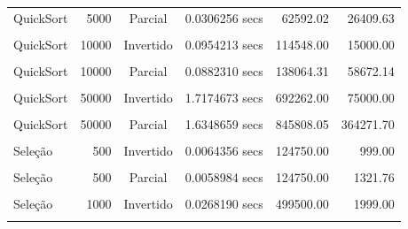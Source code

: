 \documentclass[
]{article}
\begin{document}
\begin{longtable}[l]{lrccrr}
QuickSort & 5000 & Parcial & 0.0306256 secs & 62592.02 & 26409.63\\
\cellcolor{gray!15}{QuickSort} & \cellcolor{gray!15}{10000} & \cellcolor{gray!15}{Aleatório} & \cellcolor{gray!15}{0.0971727 secs} & \cellcolor{gray!15}{143824.18} & \cellcolor{gray!15}{92592.51}\\
QuickSort & 10000 & Invertido & 0.0954213 secs & 114548.00 & 15000.00\\
\cellcolor{gray!15}{QuickSort} & \cellcolor{gray!15}{10000} & \cellcolor{gray!15}{Ordenado} & \cellcolor{gray!15}{0.0973439 secs} & \cellcolor{gray!15}{119535.00} & \cellcolor{gray!15}{0.00}\\
QuickSort & 10000 & Parcial & 0.0882310 secs & 138064.31 & 58672.14\\
\cellcolor{gray!15}{QuickSort} & \cellcolor{gray!15}{50000} & \cellcolor{gray!15}{Aleatório} & \cellcolor{gray!15}{1.7015193 secs} & \cellcolor{gray!15}{848051.17} & \cellcolor{gray!15}{543859.65}\\
QuickSort & 50000 & Invertido & 1.7174673 secs & 692262.00 & 75000.00\\
\cellcolor{gray!15}{QuickSort} & \cellcolor{gray!15}{50000} & \cellcolor{gray!15}{Ordenado} & \cellcolor{gray!15}{1.7960176 secs} & \cellcolor{gray!15}{717248.00} & \cellcolor{gray!15}{0.00}\\
QuickSort & 50000 & Parcial & 1.6348659 secs & 845808.05 & 364271.70\\
\cellcolor{gray!15}{Seleção} & \cellcolor{gray!15}{500} & \cellcolor{gray!15}{Aleatório} & \cellcolor{gray!15}{0.0060219 secs} & \cellcolor{gray!15}{124750.00} & \cellcolor{gray!15}{1485.98}\\
Seleção & 500 & Invertido & 0.0064356 secs & 124750.00 & 999.00\\
\cellcolor{gray!15}{Seleção} & \cellcolor{gray!15}{500} & \cellcolor{gray!15}{Ordenado} & \cellcolor{gray!15}{0.0070200 secs} & \cellcolor{gray!15}{124750.00} & \cellcolor{gray!15}{499.00}\\
Seleção & 500 & Parcial & 0.0058984 secs & 124750.00 & 1321.76\\
\cellcolor{gray!15}{Seleção} & \cellcolor{gray!15}{1000} & \cellcolor{gray!15}{Aleatório} & \cellcolor{gray!15}{0.0241992 secs} & \cellcolor{gray!15}{499500.00} & \cellcolor{gray!15}{2984.90}\\
Seleção & 1000 & Invertido & 0.0268190 secs & 499500.00 & 1999.00\\
\cellcolor{gray!15}{Seleção} & \cellcolor{gray!15}{1000} & \cellcolor{gray!15}{Ordenado} & \cellcolor{gray!15}{0.0241041 secs} & \cellcolor{gray!15}{499500.00} & \cellcolor{gray!15}{999.00}\\

\end{longtable}
\end{document}
